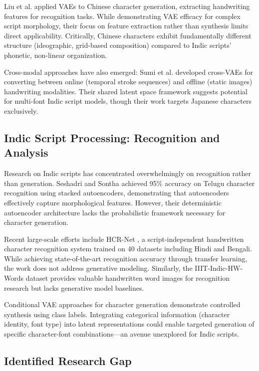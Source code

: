 \documentclass[review]{elsarticle}
\begin{document}
Liu et al. \cite{liu2019} applied VAEs to Chinese character generation, extracting handwriting features for recognition tasks. While demonstrating VAE efficacy for complex script morphology, their focus on feature extraction rather than synthesis limits direct applicability. Critically, Chinese characters exhibit fundamentally different structure (ideographic, grid-based composition) compared to Indic scripts' phonetic, non-linear organization.

Cross-modal approaches have also emerged: Sumi et al. \cite{sumi2019} developed cross-VAEs for converting between online (temporal stroke sequences) and offline (static images) handwriting modalities. Their shared latent space framework suggests potential for multi-font Indic script models, though their work targets Japanese characters exclusively.

\subsection{Indic Script Processing: Recognition and Analysis}

Research on Indic scripts has concentrated overwhelmingly on recognition rather than generation. Seshadri and Sontha \cite{seshadri2012} achieved 95\% accuracy on Telugu character recognition using stacked autoencoders, demonstrating that autoencoders effectively capture morphological features. However, their deterministic autoencoder architecture lacks the probabilistic framework necessary for character generation.

Recent large-scale efforts include HCR-Net \cite{malakar2024}, a script-independent handwritten character recognition system trained on 40 datasets including Hindi and Bengali. While achieving state-of-the-art recognition accuracy through transfer learning, the work does not address generative modeling. Similarly, the IIIT-Indic-HW-Words dataset \cite{krishnan2021} provides valuable handwritten word images for recognition research but lacks generative model baselines.

Conditional VAE approaches for character generation \cite{wang2021} demonstrate controlled synthesis using class labels. Integrating categorical information (character identity, font type) into latent representations could enable targeted generation of specific character-font combinations—an avenue unexplored for Indic scripts.

\subsection{Identified Research Gap}
\end{document}
